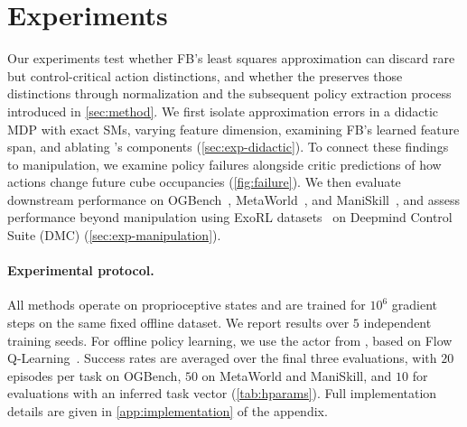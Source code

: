 \providecommand{\pmse}[1]{\,{\scriptsize$\pm$#1}}
\section{Experiments}
\label{sec:experiments}

Our experiments test whether FB's least squares approximation can discard rare but control-critical action distinctions, and whether the \name{} preserves those distinctions through normalization and the subsequent policy extraction process introduced in \cref{sec:method}.
We first isolate approximation errors in a didactic MDP with exact SMs, varying feature dimension, examining FB's learned feature span, and ablating \name{}'s components (\cref{sec:exp-didactic}). 
To connect these findings to manipulation, we examine policy failures alongside critic predictions of how actions change future cube occupancies (\cref{fig:failure}).
We then evaluate downstream performance on OGBench~\citep{park-iclr25b}, MetaWorld~\citep{mclean-neurips25a}, and ManiSkill~\citep{tao-rss25a}, and assess performance beyond manipulation using ExoRL datasets~\cite{yarats-arxiv22a} on Deepmind Control Suite (DMC) (\cref{sec:exp-manipulation}).

\paragraph{Experimental protocol.}
All methods operate on proprioceptive states and are trained for $10^6$ gradient steps on the same fixed offline dataset.
We report results over $5$ independent training seeds.
For offline policy learning, we use the actor from \citet{bagatella-iclr26a}, based on Flow Q-Learning~\citep{park-icml25a}.
Success rates are averaged over the final three evaluations, with $20$ episodes per task on OGBench, $50$ on MetaWorld and ManiSkill, and $10$ for evaluations with an inferred task vector (\cref{tab:hparams}).
Full implementation details are given in \cref{app:implementation} of the appendix.

